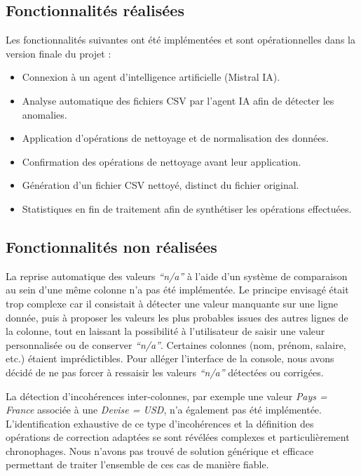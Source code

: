 \documentclass[a4paper, 12pt, twoside]{article}
\begin{document}
\subsection*{Fonctionnalités réalisées}

Les fonctionnalités suivantes ont été implémentées et sont opérationnelles dans la version finale du projet :
\begin{itemize}
    \item Connexion à un agent d’intelligence artificielle (Mistral IA).
    \item Analyse automatique des fichiers CSV par l’agent IA afin de détecter les anomalies.
    \item Application d’opérations de nettoyage et de normalisation des données.
    \item Confirmation des opérations de nettoyage avant leur application.
    \item Génération d’un fichier CSV nettoyé, distinct du fichier original.
    \item Statistiques en fin de traitement afin de synthétiser les opérations effectuées.
\end{itemize}

\subsection*{Fonctionnalités non réalisées}

La reprise automatique des valeurs \textit{``n/a''} à l’aide d’un système de comparaison au sein d’une même colonne n’a pas été implémentée. Le principe envisagé était trop complexe car il consistait à détecter une valeur manquante sur une ligne donnée, puis à proposer les valeurs les plus probables issues des autres lignes de la colonne, tout en laissant la possibilité à l’utilisateur de saisir une valeur personnalisée ou de conserver \textit{``n/a''}. Certaines colonnes (nom, prénom, salaire, etc.) étaient imprédictibles. Pour alléger l'interface de la console, nous avons décidé de ne pas forcer à ressaisir les valeurs \textit{``n/a''} détectées ou corrigées.

La détection d’incohérences inter-colonnes, par exemple une valeur \textit{Pays = France} associée à une \textit{Devise = USD}, n’a également pas été implémentée. L’identification exhaustive de ce type d’incohérences et la définition des opérations de correction adaptées se sont révélées complexes et particulièrement chronophages. Nous n’avons pas trouvé de solution générique et efficace permettant de traiter l’ensemble de ces cas de manière fiable.
\end{document}
